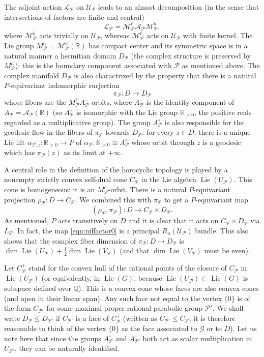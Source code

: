 \documentclass[12pt,letterpaper]{amsart}
\numberwithin{equation}{section}
\def\QQ{{\mathbb Q}}
\def\RR{{\mathbb R}}
\def\Acal{{\mathcal A}}
\def\Gcal{{\mathcal G}}
\def\Lcal{{\mathcal L}}
\def\Mcal{{\mathcal M}}
\def\Pcal{{\mathcal P}}
\def\Ucal{{\mathcal U}}
\def\half{{\tfrac{1}{2}}}
\newcommand\lie{\operatorname{Lie}}
\theoremstyle{remark}
\begin{document}
The adjoint action  $\Lcal_\Pcal$ on $\Ucal_\Pcal$ leads to an almost  decomposition  (in the sense that intersections of factors are finite and central) 
\[
\Lcal_\Pcal=\Mcal^\ell_\Pcal \Acal_\Pcal\Mcal^h_\Pcal,
\]
 where $\Mcal^h_\Pcal$ acts trivially on $\Ucal_\Pcal$, whereas  $\Mcal^\ell_\Pcal $ acts  on $\Ucal_\Pcal$ with finite kernel. 
 The  Lie group $M^h_\Pcal=\Mcal^h_\Pcal(\RR)$ has compact center and its symmetric space is in a natural manner a hermitian domain $D_\Pcal$ (the complex structure is preserved by $M^h_\Pcal$): this is the  boundary component associated with $\Pcal$ as mentioned above.  
The complex manifold   $D_\Pcal$  is also charactrized by the property that there is  a natural $P$-equivariant holomorphic  surjection 
 \[
 \pi_\Pcal: D\to D_\Pcal
 \]
whose fibers are  the $M^\ell_\Pcal A_\Pcal^\circ$-orbits, where  $A_\Pcal^\circ$ is the identity component of $A_\Pcal=\Acal_\Pcal(\RR)$ (so  $A_\Pcal^\circ$ is isomorphic with the Lie group $\RR_{>0}$, the positive reals regarded as a multiplicative group). The group $A_\Pcal^\circ$  is also responsible for  the  geodesic flow in the fibers of $\pi_\Pcal$ towards $D_\Pcal$: for every $z\in D$, there is a unique Lie lift $\alpha_{\Pcal,z}: \RR_{>0}\to P$ of $\alpha_\Pcal:\RR_{>0}\cong A_\Pcal^\circ$ whose orbit through $z$ is a geodesic which   has  $\pi_\Pcal(z)$ as its limit at $+\infty$.  

A central role in the definition of the horocyclic topology is played by a nonempty strictly  convex self-dual cone $C_\Pcal$
in the Lie algebra $\lie(U_\Pcal)$. This cone is homogeneous: it is an $M^\ell_\Pcal$-orbit. There is a natural $P$-equivariant projection $\rho_\Pcal: D\to C_\Pcal$.  We combined  this with $\pi_\Pcal$ to get 
 a $P$-equivariant map 
\begin{equation}\label{eqn:nilfactor0}
(\rho_\Pcal,\pi_\Pcal): D\to C_\Pcal\times D_\Pcal.
\end{equation}
As mentioned, $P$ acts transitively on $D$ and it is clear that it acts on $C_\Pcal\times D_\Pcal$ via $L_\Pcal$. In fact,
the map \eqref{eqn:nilfactor0} is a principal $R_u(\Ucal_\Pcal)$ bundle. This also shows  that the complex  fiber dimension of $\pi_\Pcal: D\to D_\Pcal$ is $\dim\lie (U_\Pcal)+\half\dim\lie (V_\Pcal)$ (and that  $\dim\lie (V_\Pcal)$ must be even).

 Let $C^+_\Pcal$ stand for  the convex hull of the rational points of  the  closure  of $C_\Pcal$ in $\lie(U_\Pcal)$ (or equivalently, in  $\lie(G)$, because $\lie(U_\Pcal)\subset \lie(G)$ is subspace defined over $\QQ$). 
 This is a convex cone whose  faces are also convex cones (and open in their linear span). Any such face not equal to the vertex 
 $\{0\}$ is of the form $C_{\Pcal'}$ for some maximal proper rational parabolic group $\Pcal'$.   
We shall write  $D_\Pcal\le D_{\Pcal'}$  if $C_{\Pcal'}$ is a face of $C^+_\Pcal$ (written as $C_{\Pcal'}\le C_{\Pcal}$; it is therefore reasonable to  think 
 of the vertex $\{0\}$ as the face  associated to $\Gcal$ or to $D$).
 Let us note here that since the groups $A^\circ_\Pcal$ and $A^\circ_{\Pcal'}$ both act as scalar multiplication in $U_{\Pcal'}$, they can be naturally identified.
\end{document}
